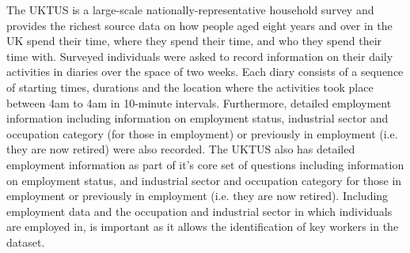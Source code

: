 \documentclass{article}
\begin{document}
\noindent The UKTUS is a large-scale nationally-representative household survey and provides the richest source data on how people aged eight years and over in the UK spend their time, where they spend their time, and who they spend their time with. Surveyed individuals were asked to record information on their daily activities in diaries over the space of two weeks. Each diary consists of a sequence of starting times, durations and the location where the activities took place between 4am to 4am in 10-minute intervals. Furthermore, detailed employment information including information on employment status, industrial sector and occupation category (for those in employment) or previously in employment (i.e. they are now retired) were also recorded. The UKTUS also has detailed employment information as part of it's core set of questions including information on employment status, and industrial sector and occupation category for those in  employment or previously in employment (i.e. they are now retired). Including employment data and the occupation and industrial sector in which individuals are employed in, is important as it allows the identification of key workers in the dataset. \\
\end{document}
